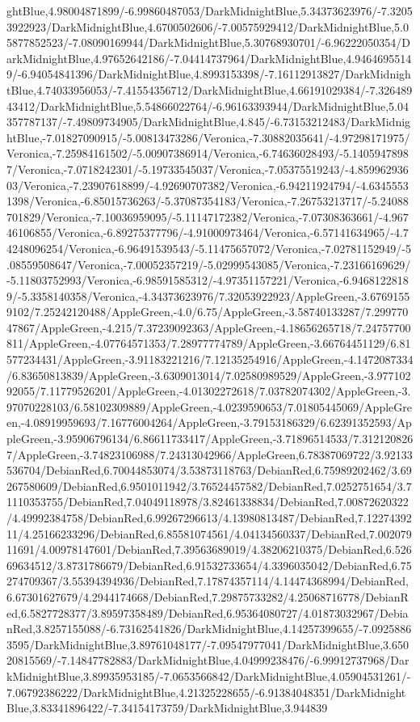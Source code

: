 {\begin{tikzternal}
ghtBlue,4.98004871899/-6.99860487053/DarkMidnightBlue,5.34373623976/-7.32053922923/DarkMidnightBlue,4.6700502606/-7.00575929412/DarkMidnightBlue,5.05877852523/-7.08090169944/DarkMidnightBlue,5.30768930701/-6.96222050354/DarkMidnightBlue,4.97652642186/-7.04414737964/DarkMidnightBlue,4.94646955149/-6.94054841396/DarkMidnightBlue,4.8993153398/-7.16112913827/DarkMidnightBlue,4.74033956053/-7.41554356712/DarkMidnightBlue,4.66191029384/-7.32648943412/DarkMidnightBlue,5.54866022764/-6.96163393944/DarkMidnightBlue,5.04357787137/-7.49809734905/DarkMidnightBlue,4.845/-6.73153212483/DarkMidnightBlue,-7.01827090915/-5.00813473286/Veronica,-7.30882035641/-4.97298171975/Veronica,-7.25984161502/-5.00907386914/Veronica,-6.74636028493/-5.14059478987/Veronica,-7.0718242301/-5.19733545037/Veronica,-7.05375519243/-4.85996293603/Veronica,-7.23907618899/-4.92690707382/Veronica,-6.94211924794/-4.63455531398/Veronica,-6.85015736263/-5.37087354183/Veronica,-7.26753213717/-5.24088701829/Veronica,-7.10036959095/-5.11147172382/Veronica,-7.07308363661/-4.96746106855/Veronica,-6.89275377796/-4.91000973464/Veronica,-6.57141634965/-4.74248096254/Veronica,-6.96491539543/-5.11475657072/Veronica,-7.02781152949/-5.08559508647/Veronica,-7.00052357219/-5.02999543085/Veronica,-7.23166169629/-5.11803752993/Veronica,-6.98591585312/-4.97351157221/Veronica,-6.94681228189/-5.3358140358/Veronica,-4.34373623976/7.32053922923/AppleGreen,-3.67691559102/7.25242120488/AppleGreen,-4.0/6.75/AppleGreen,-3.58740133287/7.29977047867/AppleGreen,-4.215/7.37239092363/AppleGreen,-4.18656265718/7.24757700811/AppleGreen,-4.07764571353/7.28977774789/AppleGreen,-3.66764451129/6.81577234431/AppleGreen,-3.91183221216/7.12135254916/AppleGreen,-4.1472087334/6.83650813839/AppleGreen,-3.6309013014/7.02580989529/AppleGreen,-3.97710292055/7.11779526201/AppleGreen,-4.01302272618/7.03782074302/AppleGreen,-3.97070228103/6.58102309889/AppleGreen,-4.0239590653/7.01805445069/AppleGreen,-4.08919959693/7.16776004264/AppleGreen,-3.79153186329/6.62391352593/AppleGreen,-3.95906796134/6.86611733417/AppleGreen,-3.71896514533/7.3121208267/AppleGreen,-3.74823106988/7.24313042966/AppleGreen,6.78387069722/3.92133536704/DebianRed,6.70044853074/3.53873118763/DebianRed,6.75989202462/3.69267580609/DebianRed,6.9501011942/3.76524457582/DebianRed,7.0252751654/3.71110353755/DebianRed,7.04049118978/3.82461338834/DebianRed,7.00872620322/4.49992384758/DebianRed,6.99267296613/4.13980813487/DebianRed,7.1227439211/4.25166233296/DebianRed,6.85581074561/4.04134560337/DebianRed,7.00207911691/4.00978147601/DebianRed,7.39563689019/4.38206210375/DebianRed,6.52669634512/3.8731786679/DebianRed,6.91532733654/4.3396035042/DebianRed,6.75274709367/3.55394394936/DebianRed,7.17874357114/4.14474368994/DebianRed,6.67301627679/4.2944174668/DebianRed,7.29875733282/4.25068716778/DebianRed,6.5827728377/3.89597358489/DebianRed,6.95364080727/4.01873032967/DebianRed,3.8257155088/-6.73162541826/DarkMidnightBlue,4.14257399655/-7.09258863595/DarkMidnightBlue,3.89761048177/-7.09547977041/DarkMidnightBlue,3.65020815569/-7.14847782883/DarkMidnightBlue,4.04999238476/-6.99912737968/DarkMidnightBlue,3.89935953185/-7.0653566842/DarkMidnightBlue,4.05904531261/-7.06792386222/DarkMidnightBlue,4.21325228655/-6.91384048351/DarkMidnightBlue,3.83341896422/-7.34154173759/DarkMidnightBlue,3.944839
\end{tikzternal}}
